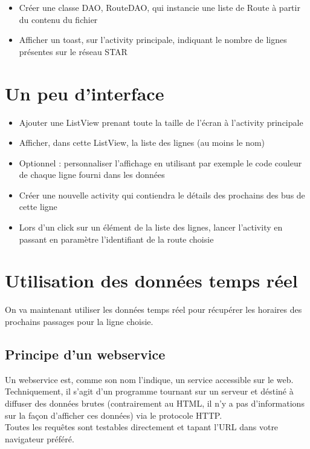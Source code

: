 \documentclass{article}
\begin{document}
\begin{itemize}
  \item Créer une classe DAO, RouteDAO, qui instancie une liste de Route à
  partir du contenu du fichier
  \item Afficher un toast, sur l'activity principale, indiquant le nombre de
  lignes présentes sur le réseau STAR
\end{itemize}
\section{Un peu d'interface}
\begin{itemize} 
  \item Ajouter une ListView prenant toute la taille de l'écran à l'activity
  principale
  \item Afficher, dans cette ListView, la liste des lignes (au moins le nom)
  \item Optionnel : personnaliser l'affichage en utilisant par exemple le code
  couleur de chaque ligne fourni dans les données
  \item Créer une nouvelle activity qui contiendra le détails des prochains des
  bus de cette ligne
  \item Lors d'un click sur un élément de la liste des lignes, lancer l'activity
  en passant en paramètre l'identifiant de la route choisie
\end{itemize}
\section{Utilisation des données temps réel}
On va maintenant utiliser les données temps réel pour récupérer les horaires des
prochains passages pour la ligne choisie.
\subsection{Principe d'un webservice}
Un webservice est, comme son nom l'indique, un service accessible sur le web.\\
Techniquement, il s'agit d'un programme tournant sur un serveur et déstiné à
diffuser des données brutes (contrairement au HTML, il n'y a pas d'informations
sur la façon d'afficher ces données) via le protocole HTTP.\\
Toutes les requêtes sont testables directement et tapant l'URL dans votre
navigateur préféré.
\end{document}

